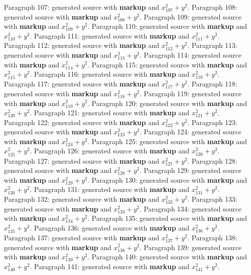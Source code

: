\documentclass{article}
\begin{document}
Paragraph 107: generated source with \textbf{markup} and $x_{107}^2 + y^2$.
Paragraph 108: generated source with \textbf{markup} and $x_{108}^2 + y^2$.
Paragraph 109: generated source with \textbf{markup} and $x_{109}^2 + y^2$.
Paragraph 110: generated source with \textbf{markup} and $x_{110}^2 + y^2$.
Paragraph 111: generated source with \textbf{markup} and $x_{111}^2 + y^2$.
Paragraph 112: generated source with \textbf{markup} and $x_{112}^2 + y^2$.
Paragraph 113: generated source with \textbf{markup} and $x_{113}^2 + y^2$.
Paragraph 114: generated source with \textbf{markup} and $x_{114}^2 + y^2$.
Paragraph 115: generated source with \textbf{markup} and $x_{115}^2 + y^2$.
Paragraph 116: generated source with \textbf{markup} and $x_{116}^2 + y^2$.
Paragraph 117: generated source with \textbf{markup} and $x_{117}^2 + y^2$.
Paragraph 118: generated source with \textbf{markup} and $x_{118}^2 + y^2$.
Paragraph 119: generated source with \textbf{markup} and $x_{119}^2 + y^2$.
Paragraph 120: generated source with \textbf{markup} and $x_{120}^2 + y^2$.
Paragraph 121: generated source with \textbf{markup} and $x_{121}^2 + y^2$.
Paragraph 122: generated source with \textbf{markup} and $x_{122}^2 + y^2$.
Paragraph 123: generated source with \textbf{markup} and $x_{123}^2 + y^2$.
Paragraph 124: generated source with \textbf{markup} and $x_{124}^2 + y^2$.
Paragraph 125: generated source with \textbf{markup} and $x_{125}^2 + y^2$.
Paragraph 126: generated source with \textbf{markup} and $x_{126}^2 + y^2$.
Paragraph 127: generated source with \textbf{markup} and $x_{127}^2 + y^2$.
Paragraph 128: generated source with \textbf{markup} and $x_{128}^2 + y^2$.
Paragraph 129: generated source with \textbf{markup} and $x_{129}^2 + y^2$.
Paragraph 130: generated source with \textbf{markup} and $x_{130}^2 + y^2$.
Paragraph 131: generated source with \textbf{markup} and $x_{131}^2 + y^2$.
Paragraph 132: generated source with \textbf{markup} and $x_{132}^2 + y^2$.
Paragraph 133: generated source with \textbf{markup} and $x_{133}^2 + y^2$.
Paragraph 134: generated source with \textbf{markup} and $x_{134}^2 + y^2$.
Paragraph 135: generated source with \textbf{markup} and $x_{135}^2 + y^2$.
Paragraph 136: generated source with \textbf{markup} and $x_{136}^2 + y^2$.
Paragraph 137: generated source with \textbf{markup} and $x_{137}^2 + y^2$.
Paragraph 138: generated source with \textbf{markup} and $x_{138}^2 + y^2$.
Paragraph 139: generated source with \textbf{markup} and $x_{139}^2 + y^2$.
Paragraph 140: generated source with \textbf{markup} and $x_{140}^2 + y^2$.
Paragraph 141: generated source with \textbf{markup} and $x_{141}^2 + y^2$.
\end{document}
